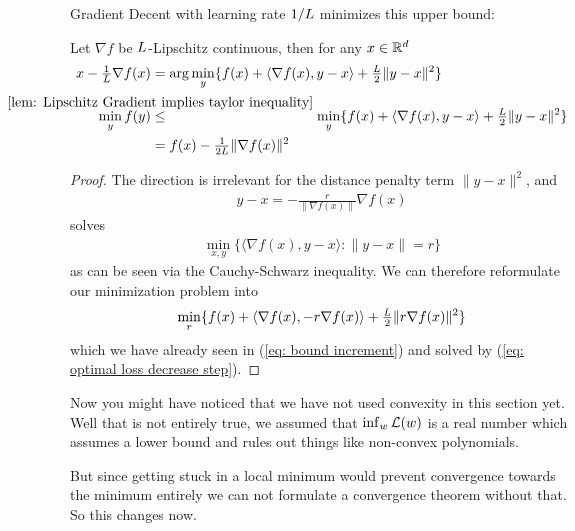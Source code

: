 Gradient Decent with learning rate \(1/L\) minimizes this upper bound:
%
\begin{lemma}\label{lem: smallest upper bound}
	Let \(\nabla f\) be \(L\)-Lipschitz continuous, then for any \(x\in\mathbb{R}^d\)
	\begin{subequations}
	\begin{align}
		x - \tfrac{1}{\ubound}\nabla f(x) 
		&= \arg\min_{y}\{
			f(x)+ \langle\nabla f(x), y-x\rangle + \tfrac{\ubound}{2}\|y-x\|^2 
		\}\\
		\label{eq: min approximation}
		\min_{y} f(y)	
		&\lxle{\ref{lem: Lipschitz Gradient implies taylor inequality}} \min_{y} \{
			f(x)+ \langle\nabla f(x), y-x\rangle + \tfrac{\ubound}{2}\|y-x\|^2 
		\} \\ \nonumber
		&= f(x) - \tfrac{1}{2\ubound} \|\nabla f(x)\|^2
	\end{align}
	\end{subequations}
\end{lemma}
\begin{proof}
	The direction is irrelevant for the distance penalty term \(\|y-x\|^2\), and
	\begin{align*}
		y-x = -\tfrac{r}{\|\nabla f(x)\|}\nabla f(x)
	\end{align*}	
	solves
	\begin{align*}
		\min_{x,y} \{\langle \nabla f(x), y-x \rangle : \|y-x\|=r \}
	\end{align*}
	as can be seen via the Cauchy-Schwarz inequality. We can  therefore
	reformulate our minimization problem into
	\begin{align*}
		\min_{r} \{ f(x) + \langle \nabla f(x), -r \nabla f(x)\rangle
		+ \tfrac{L}{2}\|r\nabla f(x)\|^2\}
	\end{align*}
	which we have already seen in (\ref{eq: bound increment}) and solved
	by (\ref{eq: optimal loss decrease step}).
\end{proof}

Now you might have noticed that we have not used convexity in this section yet.
Well that is not entirely true, we assumed that \(\inf_w\mathcal{L}(w)\)
is a real number which assumes a lower bound and rules out things like
non-convex polynomials.

But since getting stuck in a local minimum would prevent convergence towards the
minimum entirely we can not formulate a convergence theorem without that. So
this changes now.


